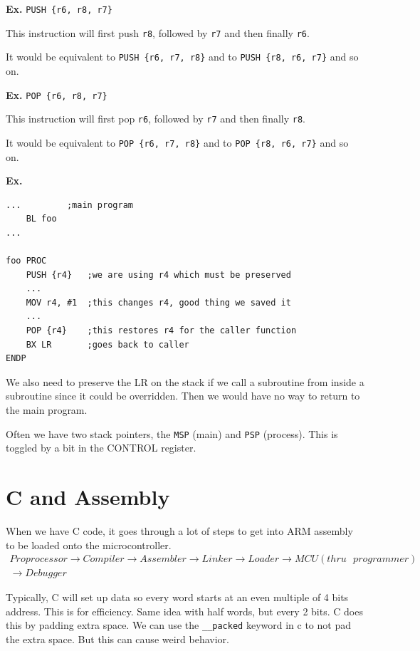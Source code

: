 \documentclass[12pt,letterpaper]{article} \usepackage{amsmath} \usepackage{graphicx} \usepackage[margin=1in]{geometry} \usepackage{longtable}  \usepackage{amssymb}
\begin{document}
	\begin{mdframed}
		\textbf{Ex.} \verb*|PUSH {r6, r8, r7}|
		
		This instruction will first push \verb|r8|, followed by \verb*|r7| and then finally \verb*|r6|.
		
		It would be equivalent to \verb*|PUSH {r6, r7, r8}| and to \verb*|PUSH {r8, r6, r7}| and so on.
	\end{mdframed}
	
	\begin{mdframed}
		\textbf{Ex.} \verb*|POP {r6, r8, r7}|
		
		This instruction will first pop \verb|r6|, followed by \verb*|r7| and then finally \verb*|r8|.
		
		It would be equivalent to \verb*|POP {r6, r7, r8}| and to \verb*|POP {r8, r6, r7}| and so on.
	\end{mdframed}
	
	\begin{mdframed}
		\textbf{Ex.}
		\begin{lstlisting}
...			;main program
	BL foo
...

foo PROC
	PUSH {r4}	;we are using r4 which must be preserved
	...
	MOV r4, #1	;this changes r4, good thing we saved it
	...
	POP {r4}	;this restores r4 for the caller function
	BX LR		;goes back to caller
ENDP
		\end{lstlisting}
	\end{mdframed}
	
	We also need to preserve the LR on the stack if we call a subroutine from inside a subroutine since it could be overridden. Then we would have no way to return to the main program.
	
	Often we have two stack pointers, the \verb*|MSP| (main) and \verb*|PSP| (process). This is toggled by a bit in the CONTROL register. 
	
	\section{C and Assembly}
	When we have C code, it goes through a lot of steps to get into ARM assembly to be loaded onto the microcontroller.
	\begin{align*}
		Proprocessor \to Compiler \to Assembler \to Linker \to Loader \to MCU (thru \text{ }programmer)\\\to Debugger
	\end{align*}
	
	Typically, C will set up data so every word starts at an even multiple of 4 bits address. This is for efficiency. Same idea with half words, but every 2 bits. C does this by padding extra space. We can use the \verb*|__packed| keyword in c to not pad the extra space. But this can cause weird behavior. 
	
\end{document}
